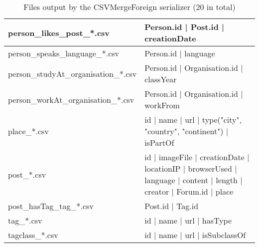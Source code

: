 \begin{table}[htb]
{\begin{tabular}{|p{4.3cm}|p{12.4cm}|}
    	person\_likes\_post\_*.csv           & Person.id | Post.id | creationDate                                                                                  \\ \hline
    	person\_speaks\_language\_*.csv      & Person.id | language                                                                                                \\ \hline
    	person\_studyAt\_organisation\_*.csv & Person.id | Organisation.id | classYear                                                                             \\ \hline
    	person\_workAt\_organisation\_*.csv  & Person.id | Organisation.id | workFrom                                                                              \\ \hline
    	place\_*.csv                         & id | name | url | type({"city", "country", "continent"}) | isPartOf                                                 \\ \hline
    	post\_*.csv                          & id | imageFile | creationDate | locationIP | browserUsed | language | content | length | creator | Forum.id | place \\ \hline
    	post\_hasTag\_tag\_*.csv             & Post.id | Tag.id                                                                                                    \\ \hline
    	tag\_*.csv                           & id | name | url | hasType                                                                                           \\ \hline
    	tagclass\_*.csv                      & id | name | url | isSubclassOf                                                                                      \\ \hline
    \end{tabular}}
    \caption{Files output by the CSVMergeForeign serializer (20 in total)}
    \label{table:csv_merge_foreign}
\end{table}
